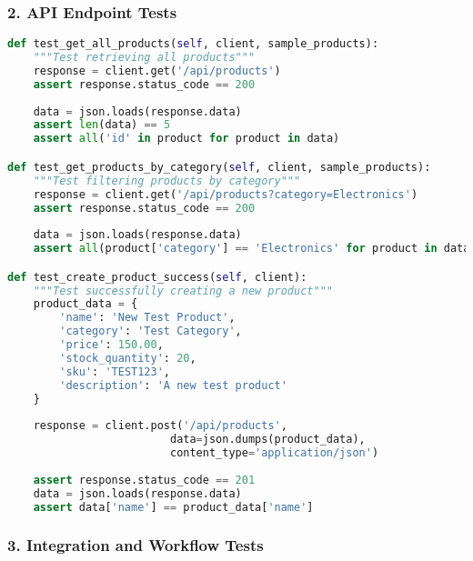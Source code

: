 \documentclass[12pt,a4paper]{article}
\begin{document}
\subsubsection{2. API Endpoint Tests}

\begin{lstlisting}[language=Python, caption=API Testing Examples]
def test_get_all_products(self, client, sample_products):
    """Test retrieving all products"""
    response = client.get('/api/products')
    assert response.status_code == 200
    
    data = json.loads(response.data)
    assert len(data) == 5
    assert all('id' in product for product in data)

def test_get_products_by_category(self, client, sample_products):
    """Test filtering products by category"""
    response = client.get('/api/products?category=Electronics')
    assert response.status_code == 200
    
    data = json.loads(response.data)
    assert all(product['category'] == 'Electronics' for product in data)

def test_create_product_success(self, client):
    """Test successfully creating a new product"""
    product_data = {
        'name': 'New Test Product',
        'category': 'Test Category',
        'price': 150.00,
        'stock_quantity': 20,
        'sku': 'TEST123',
        'description': 'A new test product'
    }
    
    response = client.post('/api/products', 
                         data=json.dumps(product_data),
                         content_type='application/json')
    
    assert response.status_code == 201
    data = json.loads(response.data)
    assert data['name'] == product_data['name']
\end{lstlisting}

\subsubsection{3. Integration and Workflow Tests}
\end{document}
